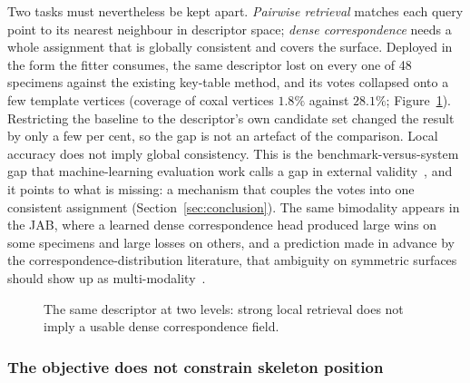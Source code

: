 Two tasks must nevertheless be kept apart. \emph{Pairwise retrieval} matches
each query point to its nearest neighbour in descriptor space; \emph{dense
correspondence} needs a whole assignment that is globally consistent and covers
the surface. Deployed in the form the fitter consumes, the same descriptor
lost on every one of 48 specimens against the existing key-table method, and
its votes collapsed onto a few template vertices (coverage of coxal vertices
$1.8\%$ against $28.1\%$; Figure~\ref{fig:local-vs-global}). Restricting the
baseline to the descriptor's own candidate set changed the result by only a few
per cent, so the gap is not an artefact of the comparison. Local accuracy does
not imply global consistency. This is the benchmark-versus-system gap that
machine-learning evaluation work calls a gap in external
validity~\cite{liao}, and it points to what is missing: a mechanism that
couples the votes into one consistent assignment (Section~\ref{sec:conclusion}).
The same bimodality appears in the JAB, where a learned dense correspondence
head produced large wins on some specimens and large losses on others, and a
prediction made in advance by the correspondence-distribution literature, that
ambiguity on symmetric surfaces should show up as multi-modality~\cite{haugaard}.

\begin{figure}[!htb]
\centering
{}
\caption[Local success versus global consistency]{The same descriptor at two
levels: strong local retrieval does not imply a usable dense correspondence
field.}
\label{fig:local-vs-global}
\end{figure}

\subsubsection{The objective does not constrain skeleton position}
\label{sec:skeleton}

